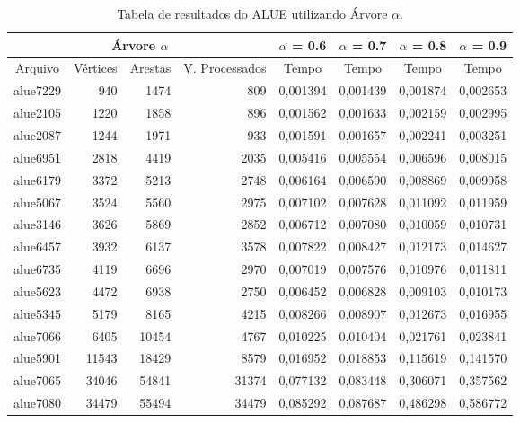 \documentclass[
	12pt,				%
	oneside,			%
	a4paper,			%
	english,			%
	french,				%
	spanish,			%
	brazil,				%
	]{abntex2}
\begin{document}
\begin{table}[H]
  \centering    
  \begin{tabular}{|c|r|r|r|r|r|r|r|}
    \toprule
    \multicolumn{4}{|c|}{\cellcolor{gray!25}\textbf{Árvore $\alpha$}} & \multicolumn{1}{|c|}{\cellcolor{gray!25}\textbf{$\alpha$ = 0.6}}     & \multicolumn{1}{|c|}{\cellcolor{gray!25}\textbf{$\alpha$ = 0.7}} & \multicolumn{1}{|c|}{\cellcolor{gray!25}\textbf{$\alpha$ = 0.8}} & \multicolumn{1}{|c|}{\cellcolor{gray!25}\textbf{$\alpha$ = 0.9}} \\
    \midrule
    \multicolumn{1}{|c|}{\cellcolor{gray!10}Arquivo} & \multicolumn{1}{|c|}{\cellcolor{gray!10}Vértices} & \multicolumn{1}{|c|}{\cellcolor{gray!10}Arestas} & \multicolumn{1}{|c|}{\cellcolor{gray!10}V. Processados} & 
    \multicolumn{1}{|c|}{\cellcolor{gray!10}Tempo} & \multicolumn{1}{|c|}{\cellcolor{gray!10}Tempo} &
    \multicolumn{1}{|c|}{\cellcolor{gray!10}Tempo} & \multicolumn{1}{|c|}{\cellcolor{gray!10}Tempo} \\
    \hline
    alue7229	&	940	&	1474	&	809	&	0,001394	&	0,001439	&	0,001874	&	0,002653	\\
    \hline
    alue2105	&	1220	&	1858	&	896	&	0,001562	&	0,001633	&	0,002159	&	0,002995	\\
    \hline
    alue2087	&	1244	&	1971	&	933	&	0,001591	&	0,001657	&	0,002241	&	0,003251	\\
    \hline
    alue6951	&	2818	&	4419	&	2035	&	0,005416	&	0,005554	&	0,006596	&	0,008015	\\
    \hline
    alue6179	&	3372	&	5213	&	2748	&	0,006164	&	0,006590	&	0,008869	&	0,009958	\\
    \hline
    alue5067	&	3524	&	5560	&	2975	&	0,007102	&	0,007628	&	0,011092	&	0,011959	\\
    \hline
    alue3146	&	3626	&	5869	&	2852	&	0,006712	&	0,007080	&	0,010059	&	0,010731	\\
    \hline
    alue6457	&	3932	&	6137	&	3578	&	0,007822	&	0,008427	&	0,012173	&	0,014627	\\
    \hline
    alue6735	&	4119	&	6696	&	2970	&	0,007019	&	0,007576	&	0,010976	&	0,011811	\\
    \hline
    alue5623	&	4472	&	6938	&	2750	&	0,006452	&	0,006828	&	0,009103	&	0,010173	\\
    \hline
    alue5345	&	5179	&	8165	&	4215	&	0,008266	&	0,008907	&	0,012673	&	0,016955	\\
    \hline
    alue7066	&	6405	&	10454	&	4767	&	0,010225	&	0,010404	&	0,021761	&	0,023841	\\
    \hline
    alue5901	&	11543	&	18429	&	8579	&	0,016952	&	0,018853	&	0,115619	&	0,141570	\\
    \hline
    alue7065	&	34046	&	54841	&	31374	&	0,077132	&	0,083448	&	0,306071	&	0,357562	\\
    \hline
    alue7080	&	34479	&	55494	&	34479	&	0,085292	&	0,087687	&	0,486298	&	0,586772	\\
    \hline
  \end{tabular}
  \caption{Tabela de resultados do ALUE utilizando Árvore $\alpha$.}  
  \label{tab:AlueAlpha}
\end{table}
\end{document}
